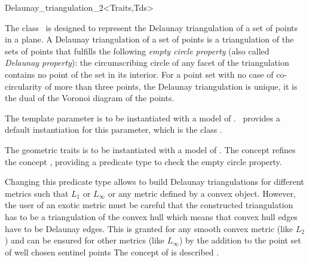 

\begin{ccRefClass}{Delaunay_triangulation_2<Traits,Tds>}  %


\ccDefinition
  
The class \ccRefName\ is designed to represent
the Delaunay triangulation of a set of points in a plane.
A  Delaunay triangulation of a set of points
is a triangulation of the sets of points that fulfills
the following {\em empty circle property} 
(also called {\em Delaunay property}): the circumscribing
circle of any facet
of the triangulation contains no point of the set in its interior.
For a point set with no case of co-circularity 
of more than three points,
the Delaunay triangulation is unique, it is  the dual
of the Voronoi diagram of the points.


\ccParameters
The template parameter 
is to be instantiated with a model of
.
\cgal\ provides a default instantiation for this parameter,
which is the class 
.

The geometric traits  
is to be instantiated with a model of
.
The concept  refines the
concept , providing
a predicate type 
to check the empty circle property.

Changing this predicate type
allows to build Delaunay triangulations for different metrics
such that $L_1$ or $L_{\infty}$ or any metric defined by a
convex object. However, the user of an exotic metric
must be careful that the constructed triangulation 
has to be a triangulation of the convex hull
which means that convex hull edges have to be Delaunay edges.
This is granted for any smooth convex metric (like $L_2$)
and can be ensured for other metrics (like  $L_{\infty}$)
by the addition to the point set of well chosen sentinel points
The concept of  is  described
.


\end{ccRefClass}
